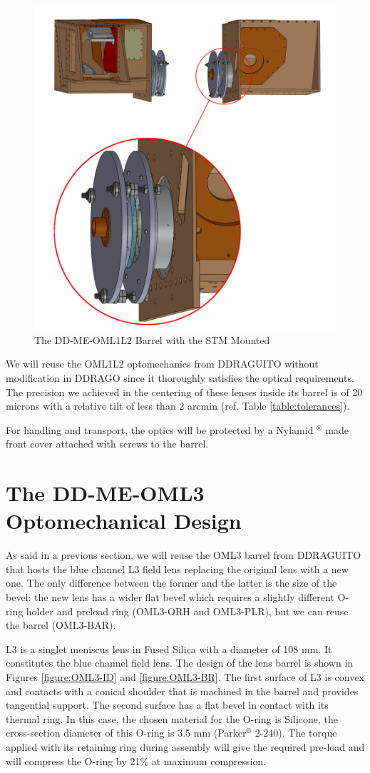 \documentclass{report}
\begin{document}
\begin{figure}
\begin{center}
\includegraphics[width=0.7\linewidth]{figures/alex-omstm.jpg}
\end{center}
\caption{The DD-ME-OML1L2 Barrel with the STM Mounted}
\label{figure:alex-omstm}
\end{figure}

We will reuse the OML1L2 optomechanics from DDRAGUITO without modification in DDRAGO since it thoroughly satisfies the optical requirements. The precision we achieved in the centering of these lenses inside its barrel is of 20 microns with a relative tilt of less than 2 arcmin  (ref. Table \ref{table:tolerances}).

For handling and transport, the optics will be protected by a Nylamid ${}^\circledR $ made front cover attached with screws to the barrel.

\section{The DD-ME-OML3 Optomechanical Design}

As said in a previous section, we will reuse the OML3 barrel from DDRAGUITO that hosts the blue channel L3 field lens replacing the original lens with a new one. The only difference between the former and the latter is the size of the bevel: the new lens has a wider flat bevel which requires a slightly different O-ring holder and preload ring (OML3-ORH and OML3-PLR), but we can reuse the barrel (OML3-BAR).

L3 is a singlet meniscus lens in Fused Silica with a diameter of 108 mm. It constitutes the blue channel field lens. The design of the lens barrel is shown in Figures \ref{figure:OML3-ID} and \ref{figure:OML3-BR}. The first surface of L3 is convex and contacts with a conical shoulder that is machined in the barrel and provides tangential support. The second surface has a flat bevel in contact with its thermal ring. In this case, the chosen material for the O-ring is Silicone, the cross-section diameter of this O-ring is 3.5 mm (Parker${}^\circledR $ 2-240). The torque applied with its retaining ring during assembly will give the required pre-load and will compress the O-ring by 21\% at maximum compression.
\end{document}
